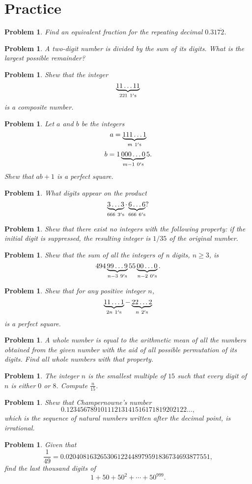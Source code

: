 \documentclass[11pt, openany]{book}
\theoremstyle{change} \theoremheaderfont{\blue\sffamily\bfseries}
\newtheorem{pro}[thm]{Problem}
\theoremstyle{nonumberplain} \theoremheaderfont{\sffamily\bfseries}
\newcommand{\dis}{\displaystyle}
\newcommand{\í}{\'{\i}}
\begin{document}
\section*{Practice}\begin{multicols}{2}\columnseprule 1pt \columnsep 25pt
\begin{pro} Find an equivalent fraction for the repeating decimal $0.31\overline{72}$.\end{pro}
\begin{pro} A two-digit number is divided by the sum of its digits. What is the largest possible remainder?
\end{pro}
\begin{pro} Shew that the integer
$$\underbrace{11\ldots 11}_{221 \ 1{\rm 's}}$$ is a composite number.
\end{pro}

\begin{pro}
Let $a$ and $b$ be the integers
$$a = \underbrace{111\ldots 1}_{m \ 1{\rm 's}}$$
$$b = 1\underbrace{000\ldots 0}_{m - 1 \ 0{\rm 's}}5.$$Shew that
$ab + 1$ is a perfect square.
\end{pro}
\begin{pro}  What digits appear on the product
$$ \underbrace{3\ldots 3}_{666 \ 3{\rm 's}}\cdot\underbrace{6\ldots 6}_{666 \ 6{\rm 's}} ?$$\end{pro}
\begin{pro}
Shew that there exist no integers with the following property: if
the initial digit is suppressed, the resulting integer is $1/35$
of the original number.
\end{pro}
\begin{pro}Shew that the sum of all the integers of  n digits, $n \geq 3$, is
$$494\underbrace{99\ldots 9}_{n - 3 \ 9{\rm 's}}55\underbrace{00\ldots 0}_{n - 2 \ 0{\rm 's}}.$$\end{pro}
\begin{pro}
Shew that for any positive integer  $n$,
$$\underbrace{11\ldots 1}_{2n \ 1{\rm 's}} - \underbrace{22\ldots 2}_{n \ 2{\rm 's}}$$is a
perfect square.
\end{pro}
\begin{pro}
A whole number is equal to the arithmetic mean of all the numbers
obtained from the given number with the aid of all possible
permutation of its digits. Find all whole numbers with that
property.
\end{pro}
\begin{pro}
The integer $n$ is the smallest multiple of $15$ such that every
digit of $n$ is either $0$ or $8$. Compute $\dis{\frac{n}{15}}$.
\end{pro}
\begin{pro}
Shew that {\em Champernowne's number }
$$0.12345678910111213141516171819202122\ldots ,$$ which is the sequence of natural numbers written
after the decimal point, is irrational.
\end{pro}
\begin{pro}
Given that $$\frac{1}{49} =
0.020408163265306122448979591836734693877551,$$ find the last
thousand digits of
$$1 + 50 + 50^2 + \cdots + 50^{999}.$$
\end{pro}


\end{multicols}
\end{document}
